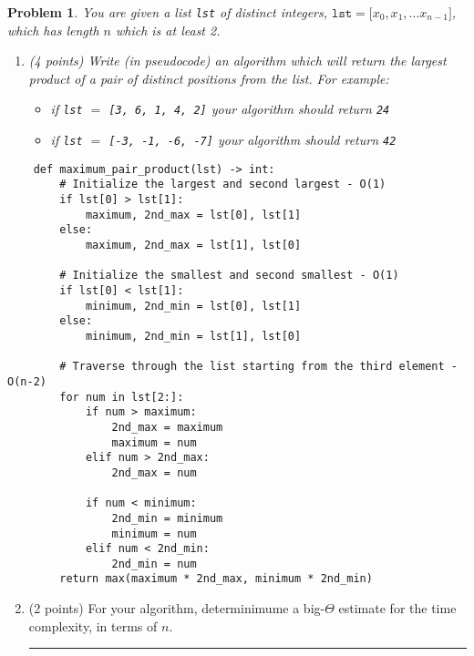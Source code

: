 \documentclass{article}
\newenvironment{solution}{\textit{Solution}.}
\theoremstyle{upright}
\newtheorem{problem}{Problem}
\def \proofDistance {5pt}
\newcommand{\proofseparator}{\par\noindent\rule{\textwidth}{0.4pt}}
\newcommand{\pb}[1]{
    \begin{problem}
    #1
    \end{problem}
}
\newcommand{\sol}[1]{
    \vspace{\proofDistance}
    \begin{customframedproof}
        \begin{solution}
        #1
        \end{solution}
    \end{customframedproof}
    \proofseparator
}
\begin{document}
\newpage

\pb{
You are given a list \texttt{lst} of distinct integers, $\texttt{lst} = \texttt{[}x_0,x_1,\dots x_{n-1}\texttt{]}$, which has length $n$ which is at least 2.
\begin{enumerate}
    \item (4 points) Write (in pseudocode) an algorithm which will return the largest product of a pair of distinct positions from the list. For example: \begin{itemize}
        \item if \texttt{lst} $=$ \texttt{[3, 6, 1, 4, 2]} your algorithm should return \texttt{24}
        \item if \texttt{lst} $=$ \texttt{[-3, -1, -6, -7]} your algorithm should return \texttt{42}
    \end{itemize}
\end{enumerate}
}
\vspace*{\fill}
\begin{lstlisting}
    def maximum_pair_product(lst) -> int:
        # Initialize the largest and second largest - O(1)
        if lst[0] > lst[1]:
            maximum, 2nd_max = lst[0], lst[1]
        else:
            maximum, 2nd_max = lst[1], lst[0]
    
        # Initialize the smallest and second smallest - O(1)
        if lst[0] < lst[1]:
            minimum, 2nd_min = lst[0], lst[1]
        else:
            minimum, 2nd_min = lst[1], lst[0]
    
        # Traverse through the list starting from the third element - O(n-2)
        for num in lst[2:]:
            if num > maximum:
                2nd_max = maximum 
                maximum = num
            elif num > 2nd_max:
                2nd_max = num  
    
            if num < minimum:
                2nd_min = minimum 
                minimum = num 
            elif num < 2nd_min:
                2nd_min = num 
        return max(maximum * 2nd_max, minimum * 2nd_min)
\end{lstlisting}
\vspace{0.5cm}
\begin{enumerate}
    \setcounter{enumi}{1}
    \item (2 points) For your algorithm, determinimume a big-$\Theta$ estimate for the time complexity, in terms of $n$.
    \sol{
    $\Theta(n)$
    }
\end{enumerate}

\newpage
\end{document}
